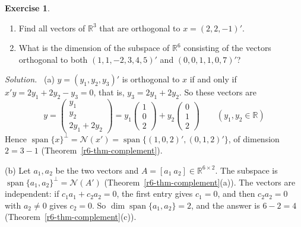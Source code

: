 \documentclass[12pt]{article}
\newcommand{\R}{\mathbb R}
\DeclareMathOperator{\Span}{span}
\theoremstyle{definition}
\newtheorem{exercise}{Exercise}
\newenvironment{solution}{\par\noindent\textit{Solution.}\ }{\par\smallskip}
\begin{document}
\begin{exercise}\label{r6-ex-complements}
\begin{enumerate}
\item Find all vectors of \(\R^3\) that are orthogonal to \(x=(2,2,-1)'\).
\item What is the dimension of the subspace of \(\R^6\) consisting of the vectors orthogonal to both
\((1,1,-2,3,4,5)'\) and \((0,0,1,1,0,7)'\)?
\end{enumerate}
\end{exercise}
\begin{solution}
(a) \(y=(y_1,y_2,y_3)'\) is orthogonal to \(x\) if and only if \(x'y=2y_1+2y_2-y_3=0\), that is,
\(y_3=2y_1+2y_2\). So these vectors are
\[
y=\begin{pmatrix}y_1\\y_2\\2y_1+2y_2\end{pmatrix}=y_1\begin{pmatrix}1\\0\\2\end{pmatrix}+y_2\begin{pmatrix}0\\1\\2\end{pmatrix}\qquad(y_1,y_2\in\R)
\]
Hence \(\Span\{x\}^\perp=\mathcal N(x')=\Span\{(1,0,2)',(0,1,2)'\}\), of dimension \(2=3-1\)
(Theorem~\ref{r6-thm-complement}).

(b) Let \(a_1,a_2\) be the two vectors and \(A=[a_1\ a_2]\in\R^{6\times2}\). The subspace is
\(\Span\{a_1,a_2\}^\perp=\mathcal N(A')\) (Theorem~\ref{r6-thm-complement}(a)). The vectors are independent:
if \(c_1a_1+c_2a_2=0\), the first entry gives \(c_1=0\), and then \(c_2a_2=0\) with \(a_2\ne0\) gives \(c_2=0\).
So \(\dim\Span\{a_1,a_2\}=2\), and the answer is \(6-2=4\) (Theorem~\ref{r6-thm-complement}(c)).
\end{solution}
\end{document}

